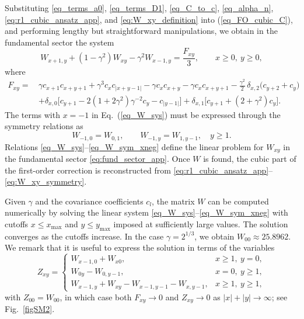\documentclass[aps,twocolumn,superscriptaddress]{revtex4-2}
\begin{document}
Substituting \eqref{eq_terms_a0}, \eqref{eq_terms_D1}, \eqref{eq_C_to_c},
\eqref{eq_alpha_n}, \eqref{eq:r1_cubic_ansatz_app}, and \eqref{eq:W_xy_definition} into (\ref{eq_FO_cubic_C}),
and performing lengthy but straightforward manipulations, we obtain in the fundamental sector the system
\begin{equation}
\label{eq_W_sys}
W_{x+1,y}
+(1-\gamma^2)W_{xy}
-\gamma^2 W_{x-1,y} = \frac{F_{xy}}{3},
\qquad x \ge 0,\ y \ge 0,
\end{equation}
where
\begin{align}
F_{xy}
=\,
& \gamma c_{x+1}c_{x+y+1}
+\gamma^3 c_x c_{|x+y-1|}
-\gamma c_x c_{x+y}
-\gamma c_x c_{x+y+1}
-\frac{\gamma^2}{2}\,\delta_{x,2}\bigl(c_{y+2}+c_y\bigr)
\nonumber\\
&+\delta_{x,0}\bigl[c_{y+1}-2(1+2\gamma^2)\gamma^{-2}c_y-c_{|y-1|}\bigr]
+\delta_{x,1}\bigl[c_{y+1}+(2+\gamma^2)c_y\bigr].
\label{eq:F_sector_semiexplicit}
\end{align}
The terms with \(x=-1\) in Eq.~(\ref{eq_W_sys}) must be expressed through the symmetry relations as
\begin{equation}
\label{eq_W_sym_xneg}
W_{-1,0} = W_{0,1}, \qquad
W_{-1,y} = W_{1,y-1}, \quad y \ge 1.
\end{equation}
Relations \eqref{eq_W_sys}--\eqref{eq_W_sym_xneg} define the linear problem for
\(W_{xy}\) in the fundamental sector \eqref{eq:fund_sector_app}. Once \(W\) is found,
the cubic part of the first-order correction is reconstructed from
\eqref{eq:r1_cubic_ansatz_app}--\eqref{eq:W_xy_symmetry}.

Given \(\gamma\) and the covariance coefficients \(c_l\), the matrix \(W\) can be computed numerically by solving the linear system \eqref{eq_W_sys}--\eqref{eq_W_sym_xneg} with cutoffs \(x\le x_{\max}\) and \(y\le y_{\max}\) imposed at sufficiently large values. The solution converges as the cutoffs increase. In the case \(\gamma=2^{1/3}\), we obtain \(W_{00}\approx 25.8962\).
We remark that it is useful to express the solution in terms of the variables
\begin{equation}
\label{eq:Z_from_W}
Z_{xy}=
\begin{cases}
W_{x-1,0}+W_{x0}, & x\ge 1,\ y = 0,\\[1mm]
W_{0y}-W_{0,y-1}, & x=0,\ y \ge 1,\\[1mm]
W_{x-1,y}+W_{xy}-W_{x-1,y-1}-W_{x,y-1}, & x\ge 1,\ y \ge 1,
\end{cases}
\end{equation}
with \(Z_{00}=W_{00}\), in which case both $F_{xy} \to 0$ and $Z_{xy} \to 0$ as $|x|+|y| \to \infty$; see Fig.~\ref{figSM2}.
\end{document}
